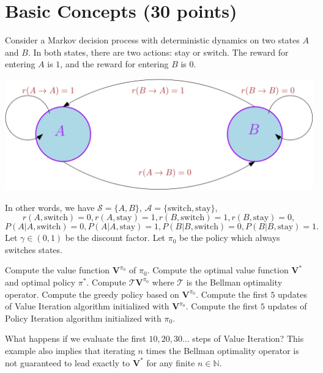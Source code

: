 \newpage
\section{Basic Concepts (30 points)}
Consider a Markov decision process with deterministic dynamics on two states $A$
  and $B$. In both states, there are two actions: stay or switch.
  The reward for entering $A$ is $1$, and the reward for entering $B$ is $0$.

  \vspace{8pt}
  \begin{center}
    \includegraphics[width=0.6\linewidth]{mdp_2state.png}
  \end{center}
  \vspace{8pt}
In other words, we have $\mathcal{S}=\{A,B\}$, $\mathcal{A}=\{\text{switch}, \text{stay}\}$,
$$
r(A,\text{switch})=0, r(A,\text{stay})=1, r(B,\text{switch})=1, r(B,\text{stay})=0,
$$
$$
P(A|A,\text{switch})=0, P(A|A,\text{stay})=1, P(B|B,\text{switch})=0, P(B|B,\text{stay})=1.
$$
Let $\gamma\in(0,1)$ be the discount factor. Let $\pi_0$ be the policy which always switches states.
  

\begin{questions}
    \question[5]  Compute the value function $\textbf{V}^{\pi_0}$ of $\pi_0$. 
    \question[5]  Compute the optimal value function $\textbf{V}^*$ and optimal policy $\pi^*$.
    \question[5]  Compute $\mathcal{T}\mathbf{V}^{\pi_0}$ where $\mathcal{T}$ is the Bellman optimality operator.
    \question[5]  Compute the greedy policy based on $\textbf{V}^{\pi_0}$. 
    \question[5] Compute the first $5$ updates of Value Iteration algorithm initialized with $\textbf{V}^{\pi_0}$.
    \question[5] Compute the first $5$ updates of Policy Iteration algorithm initialized with $\pi_0$.
\end{questions}

\begin{remark}
What happens if we evaluate the first $10,20,30\dots$ steps of Value Iteration? This example also implies that iterating $n$ times the Bellman optimality operator  is not guaranteed to lead exactly to $\mathbf{V}^*$ for any finite $n \in \mathbb{N}$. 
\end{remark}

